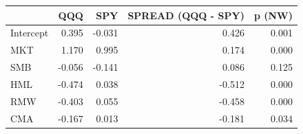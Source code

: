 \begin{tabular}{lrrrr}
\toprule
 & QQQ & SPY & SPREAD (QQQ - SPY) & p (NW) \\
\midrule
Intercept & 0.395 & -0.031 & 0.426 & 0.001 \\
MKT & 1.170 & 0.995 & 0.174 & 0.000 \\
SMB & -0.056 & -0.141 & 0.086 & 0.125 \\
HML & -0.474 & 0.038 & -0.512 & 0.000 \\
RMW & -0.403 & 0.055 & -0.458 & 0.000 \\
CMA & -0.167 & 0.013 & -0.181 & 0.034 \\
\bottomrule
\end{tabular}
